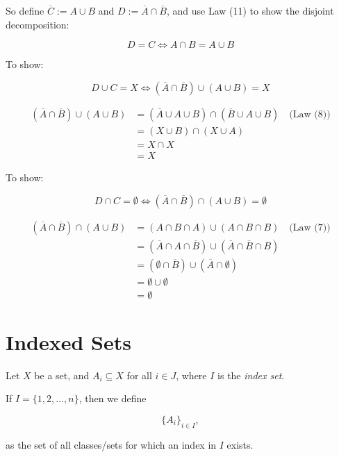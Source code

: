So define \( \overline{C} := A \cup B \) and \( D := \overline{A} \cap \overline{B} \),
and use Law (11) to show the disjoint decomposition:

\[
	D = C \iff A \cap B = A \cup B
\]

To show:

\[
	D \cup C = X \iff (\overline{A} \cap \overline{B}) \cup (A \cup B) = X
\]

\begin{align*}
	(\overline{A} \cap \overline{B}) \cup (A \cup B)
	 & = (\overline{A} \cup A \cup B) \cap (\overline{B} \cup A \cup B) \quad \text{(Law (8))} \\
	 & = (X \cup B) \cap (X \cup A)                                                            \\
	 & = X \cap X                                                                              \\
	 & = X
\end{align*}

To show:

\[
	D \cap C = \emptyset \iff (\overline{A} \cap \overline{B}) \cap (A \cup B) = \emptyset
\]

\begin{align*}
	(\overline{A} \cap \overline{B}) \cap (A \cup B)
	 & = (A \cap B \cap A) \cup (A \cap B \cap B) \quad \text{(Law (7))}                      \\
	 & = (\overline{A} \cap A \cap \overline{B}) \cup (\overline{A} \cap \overline{B} \cap B) \\
	 & = (\emptyset \cap \overline{B}) \cup (\overline{A} \cap \emptyset)                     \\
	 & = \emptyset \cup \emptyset                                                             \\
	 & = \emptyset
\end{align*}

\QED

\section{Indexed Sets}

Let \(X\) be a set, and \( A_i \subseteq X \) for all \( i \in J \), where \(I\) is the
\emph{index set}.

If \( I = \{1, 2, \dots, n\} \), then we define

\[
	\{A_i\}_{i \in I},
\]

as the set of all classes/sets for which an index in \(I\) exists.

